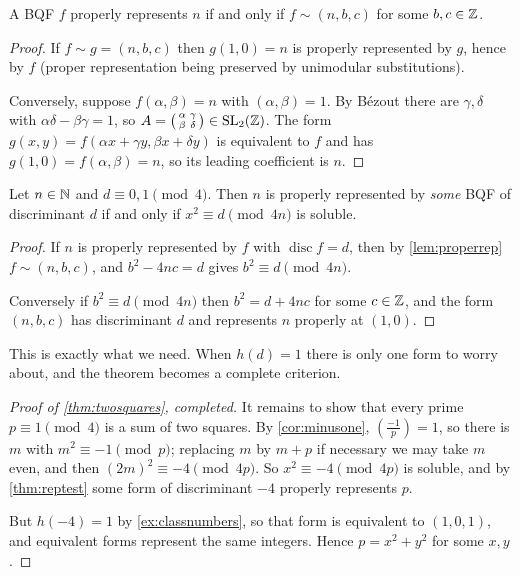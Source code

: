 \documentclass[a4paper]{scrartcl}
\DeclareMathOperator{\disc}{disc}
\begin{document}
\begin{lemma}\label{lem:properrep}
	A BQF $f$ properly represents $n$ if and only if $f \sim (n, b, c)$ for some $b, c \in \mathbb{Z}$.
\end{lemma}
\begin{proof}
	If $f \sim g = (n, b, c)$ then $g(1, 0) = n$ is properly represented by $g$, hence by $f$ (proper representation being preserved by unimodular substitutions).

	Conversely, suppose $f(\alpha, \beta) = n$ with $(\alpha, \beta) = 1$. By Bézout there are $\gamma, \delta$ with $\alpha\delta - \beta\gamma = 1$, so $A = \left(\begin{smallmatrix} \alpha & \gamma \\ \beta & \delta \end{smallmatrix}\right) \in \operatorname{SL}_2(\mathbb{Z})$. The form $g(x,y) = f(\alpha x + \gamma y, \beta x + \delta y)$ is equivalent to $f$ and has $g(1,0) = f(\alpha,\beta) = n$, so its leading coefficient is $n$.
\end{proof}

\begin{theorem}\label{thm:reptest}
	Let $n \in \mathbb{N}$ and $d \equiv 0, 1 \pmod 4$. Then $n$ is properly represented by \emph{some} BQF of discriminant $d$ if and only if $x^2 \equiv d \pmod{4n}$ is soluble.
\end{theorem}
\begin{proof}
	If $n$ is properly represented by $f$ with $\disc f = d$, then by \autoref{lem:properrep} $f \sim (n, b, c)$, and $b^2 - 4nc = d$ gives $b^2 \equiv d \pmod {4n}$.

	Conversely if $b^2 \equiv d \pmod{4n}$ then $b^2 = d + 4nc$ for some $c \in \mathbb{Z}$, and the form $(n, b, c)$ has discriminant $d$ and represents $n$ properly at $(1,0)$.
\end{proof}

This is exactly what we need. When $h(d) = 1$ there is only one form to worry about, and the theorem becomes a complete criterion.

\begin{proof}[Proof of \autoref{thm:twosquares}, completed]
	It remains to show that every prime $p \equiv 1 \pmod 4$ is a sum of two squares. By \autoref{cor:minusone}, $\left( \frac{-1}p \right) = 1$, so there is $m$ with $m^2 \equiv -1 \pmod p$; replacing $m$ by $m + p$ if necessary we may take $m$ even, and then $(2m)^2 \equiv -4 \pmod{4p}$. So $x^2 \equiv -4 \pmod{4p}$ is soluble, and by \autoref{thm:reptest} some form of discriminant $-4$ properly represents $p$.

	But $h(-4) = 1$ by \autoref{ex:classnumbers}, so that form is equivalent to $(1,0,1)$, and equivalent forms represent the same integers. Hence $p = x^2 + y^2$ for some $x, y$.
\end{proof}
\end{document}
